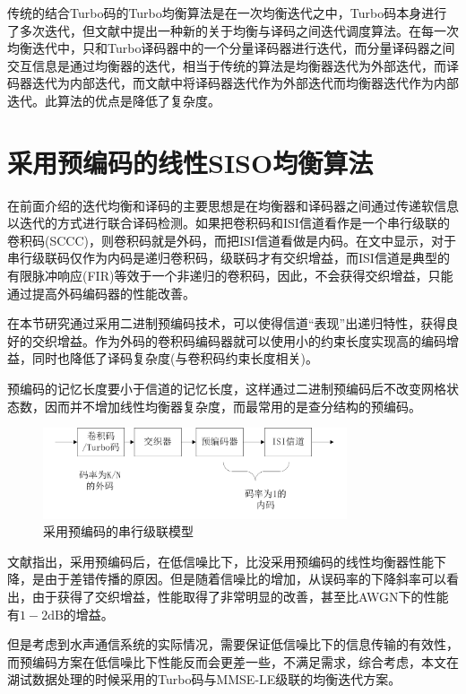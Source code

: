 传统的结合Turbo码的Turbo均衡算法是在一次均衡迭代之中，Turbo码本身进行了多次迭代，但文献中提出一种新的关于均衡与译码之间迭代调度算法。在每一次均衡迭代中，只和Turbo译码器中的一个分量译码器进行迭代，而分量译码器之间交互信息是通过均衡器的迭代，相当于传统的算法是均衡器迭代为外部迭代，而译码器迭代为内部迭代，而文献中将译码器迭代作为外部迭代而均衡器迭代作为内部迭代。此算法的优点是降低了复杂度。
\section{采用预编码的线性SISO均衡算法}
在前面介绍的迭代均衡和译码的主要思想是在均衡器和译码器之间通过传递软信息以迭代的方式进行联合译码检测。如果把卷积码和ISI信道看作是一个串行级联的卷积码(SCCC)\cite{Benedetto1998}，则卷积码就是外码，而把ISI信道看做是内码。在文中显示，对于串行级联码仅作为内码是递归卷积码，级联码才有交织增益，而ISI信道是典型的有限脉冲响应(FIR)等效于一个非递归的卷积码，因此，不会获得交织增益，只能通过提高外码编码器的性能改善。

在本节研究通过采用二进制预编码技术，可以使得信道“表现”出递归特性，获得良好的交织增益。作为外码的卷积码编码器就可以使用小的约束长度实现高的编码增益，同时也降低了译码复杂度(与卷积码约束长度相关)。

预编码的记忆长度要小于信道的记忆长度，这样通过二进制预编码后不改变网格状态数，因而并不增加线性均衡器复杂度，而最常用的是查分结构的预编码。
\begin{figure}[htb]
  \begin{center}
    \includegraphics[width=0.8\textwidth]{images/diffcoder.pdf}
  \end{center}
  \caption{采用预编码的串行级联模型}
  \label{fig:3.8}
\end{figure}

文献指出，采用预编码后，在低信噪比下，比没采用预编码的线性均衡器性能下降，是由于差错传播的原因。但是随着信噪比的增加，从误码率的下降斜率可以看出，由于获得了交织增益，性能取得了非常明显的改善，甚至比AWGN下的性能有$1-2\mbox{dB}$的增益。

但是考虑到水声通信系统的实际情况，需要保证低信噪比下的信息传输的有效性，而预编码方案在低信噪比下性能反而会更差一些，不满足需求，综合考虑，本文在湖试数据处理的时候采用的Turbo码与MMSE-LE级联的均衡迭代方案。

